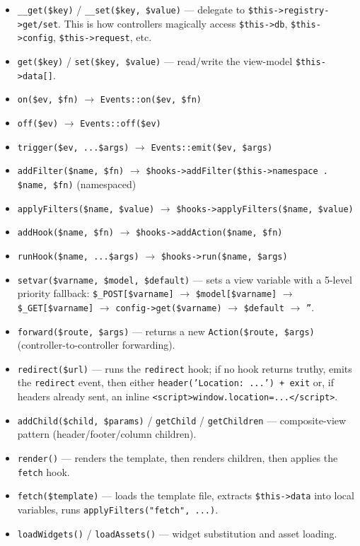 \documentclass[11pt,a4paper]{article}
\begin{document}
\begin{itemize}[leftmargin=1.6em,itemsep=2pt]
  \item \texttt{\_\_get(\$key)} / \texttt{\_\_set(\$key, \$value)} ---
        delegate to \texttt{\$this->registry->get/set}. This is how
        controllers magically access \texttt{\$this->db},
        \texttt{\$this->config}, \texttt{\$this->request}, etc.
  \item \texttt{get(\$key)} / \texttt{set(\$key, \$value)} ---
        read/write the view-model \texttt{\$this->data[]}.
  \item \texttt{on(\$ev, \$fn)} $\to$ \texttt{Events::on(\$ev, \$fn)}
  \item \texttt{off(\$ev)} $\to$ \texttt{Events::off(\$ev)}
  \item \texttt{trigger(\$ev, ...\$args)} $\to$
        \texttt{Events::emit(\$ev, \$args)}
  \item \texttt{addFilter(\$name, \$fn)} $\to$
        \texttt{\$hooks->addFilter(\$this->namespace . \$name, \$fn)}
        (namespaced)
  \item \texttt{applyFilters(\$name, \$value)} $\to$
        \texttt{\$hooks->applyFilters(\$name, \$value)}
  \item \texttt{addHook(\$name, \$fn)} $\to$
        \texttt{\$hooks->addAction(\$name, \$fn)}
  \item \texttt{runHook(\$name, ...\$args)} $\to$
        \texttt{\$hooks->run(\$name, \$args)}
  \item \texttt{setvar(\$varname, \$model, \$default)} --- sets a
        view variable with a 5-level priority fallback:
        \texttt{\$\_POST[\$varname]} $\to$
        \texttt{\$model[\$varname]} $\to$
        \texttt{\$\_GET[\$varname]} $\to$
        \texttt{config->get(\$varname)} $\to$
        \texttt{\$default} $\to$ \texttt{''}.
  \item \texttt{forward(\$route, \$args)} --- returns a new
        \texttt{Action(\$route, \$args)} (controller-to-controller
        forwarding).
  \item \texttt{redirect(\$url)} --- runs the \texttt{redirect} hook;
        if no hook returns truthy, emits the \texttt{redirect} event,
        then either \texttt{header('Location: ...') + exit} or, if
        headers already sent, an inline
        \texttt{<script>window.location=...</script>}.
  \item \texttt{addChild(\$child, \$params)} /
        \texttt{getChild} / \texttt{getChildren} --- composite-view
        pattern (header/footer/column children).
  \item \texttt{render()} --- renders the template, then renders
        children, then applies the \texttt{fetch} hook.
  \item \texttt{fetch(\$template)} --- loads the template file,
        extracts \texttt{\$this->data} into local variables, runs
        \texttt{applyFilters("fetch", ...)}.
  \item \texttt{loadWidgets()} / \texttt{loadAssets()} --- widget
        substitution and asset loading.
\end{itemize}
\end{document}
